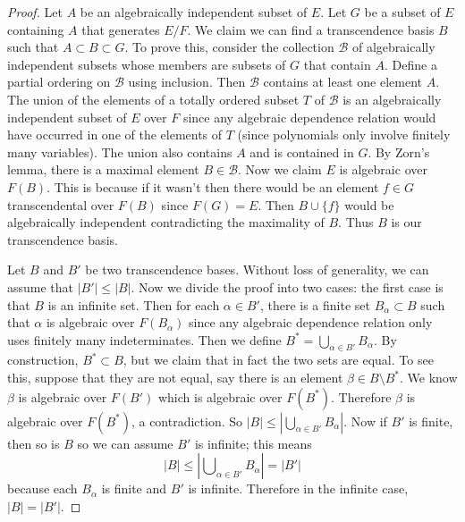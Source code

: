 \begin{proof}
Let $A$ be an algebraically independent subset of $E$. Let $G$ be a subset
of $E$ containing $A$ that generates $E/F$. We claim we can find a
transcendence basis $B$ such that $A \subset B \subset G$.
To prove this, consider the collection $\mathcal{B}$ of algebraically
independent subsets whose members are subsets of $G$ that contain $A$.
Define a partial ordering on $\mathcal{B}$ using inclusion.
Then $\mathcal{B}$ contains at least one element $A$.
The union of the elements of a totally ordered subset $T$ of $\mathcal{B}$
is an algebraically independent subset of $E$ over $F$ since any algebraic
dependence relation would have occurred in one of the elements of $T$
(since polynomials only involve finitely many variables). The union also
contains $A$ and is contained in $G$. By Zorn's lemma, there is a maximal
element $B \in \mathcal{B}$. Now we claim $E$ is algebraic over $F(B)$.
This is because if it wasn't then there would be an element
$f \in G$ transcendental over $F(B)$ since $F(G) = E$. Then
$B \cup\{f\}$ would be algebraically independent contradicting the
maximality of $B$. Thus $B$ is our transcendence basis.

\medskip\noindent
Let $B$ and $B'$ be two transcendence bases. Without loss of generality, we
can assume that $|B'| \leq |B|$. Now we divide the proof into two cases: the
first case is that $B$ is an infinite set. Then for each $\alpha \in B'$,
there is a finite set $B_{\alpha} \subset B$ such that $\alpha$ is algebraic
over
$F(B_{\alpha})$ since any algebraic dependence relation only uses finitely many
indeterminates. Then we define $B^* = \bigcup_{\alpha\in B'} B_{\alpha}$.
By construction, $B^* \subset B$, but we claim that in fact the two sets are
equal. To see this, suppose that they are not equal, say there is an element
$\beta \in B \setminus B^*$. We know $\beta$ is algebraic over $F(B')$ which
is algebraic over $F(B^*)$. Therefore $\beta$ is algebraic over $F(B^*)$, a
contradiction. So $|B| \leq |\bigcup_{\alpha \in B'} B_{\alpha}|$.
Now if $B'$ is finite, then so is $B$ so we can assume $B'$ is infinite;
this means
$$
|B| \leq |\bigcup\nolimits_{\alpha \in B'} B_{\alpha}| = |B'|
$$
because each $B_\alpha$ is finite and $B'$ is infinite. Therefore in the
infinite case, $|B| = |B'|$.


\end{proof}
